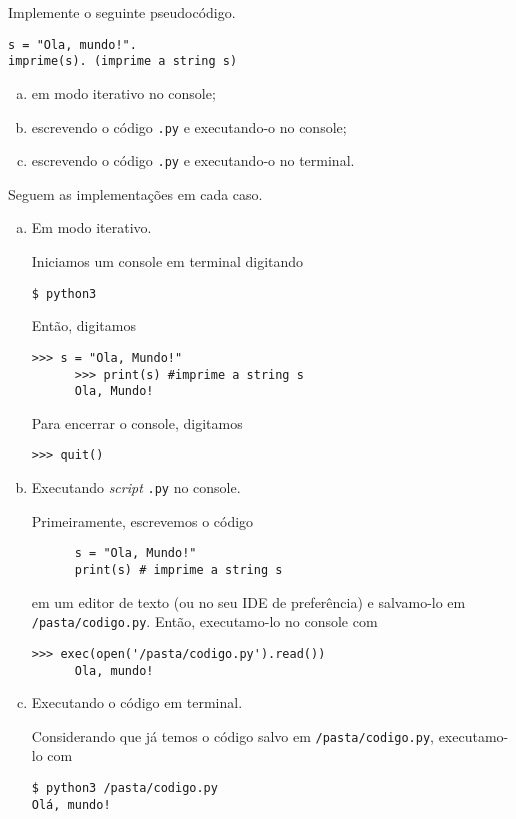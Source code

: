 \documentclass[12pt]{article}
\begin{document}
\begin{ex}
  Implemente o seguinte pseudocódigo.
\begin{verbatim}
s = "Ola, mundo!".
imprime(s). (imprime a string s)
\end{verbatim}
  \begin{enumerate}[a)]
  \item em modo iterativo no console;
  \item escrevendo o código \verb+.py+ e executando-o no console;
  \item escrevendo o código \verb+.py+ e executando-o no terminal.
  \end{enumerate}
  
   Seguem as implementações em cada caso.

  \begin{enumerate}[a)]
  \item Em modo iterativo.

    Iniciamos um console {\python} em terminal digitando
\begin{verbatim}
$ python3
\end{verbatim}
    Então, digitamos
    \begin{lstlisting}[xleftmargin=-3em]
      >>> s = "Ola, Mundo!"
      >>> print(s) #imprime a string s
      Ola, Mundo!
    \end{lstlisting}
    Para encerrar o console, digitamos
    \begin{lstlisting}[xleftmargin=-3em]
      >>> quit()
    \end{lstlisting}
    
  \item Executando {\it script} \verb+.py+ no console.

    Primeiramente, escrevemos o código
    \begin{lstlisting}
      s = "Ola, Mundo!"
      print(s) # imprime a string s
    \end{lstlisting}
    em um editor de texto (ou no seu IDE de preferência) e salvamo-lo em \verb+/pasta/codigo.py+. Então, executamo-lo no console {\python} com
    \begin{lstlisting}[xleftmargin=-3em]
      >>> exec(open('/pasta/codigo.py').read())
      Ola, mundo!
    \end{lstlisting}

  \item Executando o código em terminal.

    Considerando que já temos o código salvo em \verb+/pasta/codigo.py+, executamo-lo com
\begin{verbatim}
$ python3 /pasta/codigo.py
Olá, mundo!
\end{verbatim}
  \end{enumerate}
\end{ex}
\end{document}
